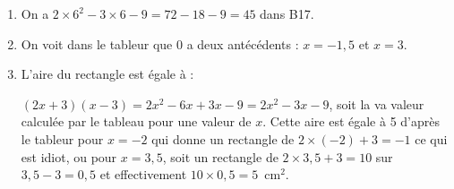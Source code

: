 \begin{enumerate}
\item On a $2\times 6^2 - 3 \times 6 - 9 = 72 - 18 - 9 = 45$ dans B17.
\item On voit dans le tableur que 0 a deux antécédents : $x = - 1,5$ et $x = 3$.
\item L'aire du rectangle est égale à :

$(2x + 3)(x - 3) = 2x^2 - 6x + 3x - 9 = 2x^2 - 3x - 9$, soit la va valeur calculée par le tableau pour une valeur de $x$. Cette aire est égale à 5 d'après le tableur pour $x = - 2$ qui donne un rectangle de $2 \times (- 2) + 3 =  - 1$ ce qui est idiot, ou pour $x = 3,5$, soit un rectangle de $2\times 3,5 + 3 = 10$ sur $3,5 - 3 = 0,5$ et effectivement $10 \times 0,5 = 5$~cm$^2$.
\end{enumerate}

\bigskip

